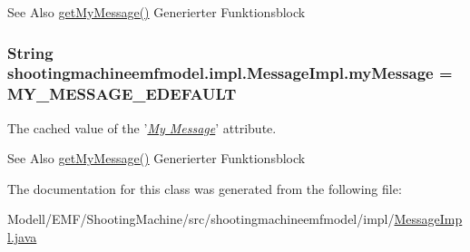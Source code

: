 \begin{DoxySeeAlso}{See Also}
\hyperlink{classshootingmachineemfmodel_1_1impl_1_1_message_impl_a73e1956a1f5c8f4cd5d1c34c94cd6373}{get\-My\-Message()} Generierter Funktionsblock  
\end{DoxySeeAlso}
\hypertarget{classshootingmachineemfmodel_1_1impl_1_1_message_impl_a4fb6f3927dfebddacbd06a8f1994b687}{
\subsubsection[{my\-Message}]{\setlength{\rightskip}{0pt plus 5cm}String shootingmachineemfmodel.\-impl.\-Message\-Impl.\-my\-Message = {\bf M\-Y\-\_\-\-M\-E\-S\-S\-A\-G\-E\-\_\-\-E\-D\-E\-F\-A\-U\-L\-T}\hspace{0.3cm}{\ttfamily [protected]}}}\label{classshootingmachineemfmodel_1_1impl_1_1_message_impl_a4fb6f3927dfebddacbd06a8f1994b687}
The cached value of the '\hyperlink{classshootingmachineemfmodel_1_1impl_1_1_message_impl_a73e1956a1f5c8f4cd5d1c34c94cd6373}{{\itshape My Message}}' attribute.

\begin{DoxySeeAlso}{See Also}
\hyperlink{classshootingmachineemfmodel_1_1impl_1_1_message_impl_a73e1956a1f5c8f4cd5d1c34c94cd6373}{get\-My\-Message()} Generierter Funktionsblock  
\end{DoxySeeAlso}


The documentation for this class was generated from the following file\-:\begin{DoxyCompactItemize}
\item 
Modell/\-E\-M\-F/\-Shooting\-Machine/src/shootingmachineemfmodel/impl/\hyperlink{_message_impl_8java}{Message\-Impl.\-java}\end{DoxyCompactItemize}
